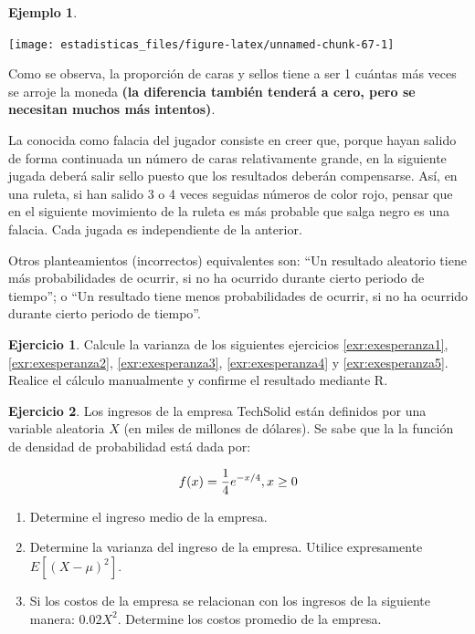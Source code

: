 \documentclass[
  11pt,
]{book}
\providecommand{\tightlist}{%
  \setlength{\itemsep}{0pt}\setlength{\parskip}{0pt}}
\theoremstyle{definition}
\theoremstyle{definition}
\newtheorem{example}{Ejemplo}[chapter]
\theoremstyle{definition}
\newtheorem{exercise}{Ejercicio}[chapter]
\theoremstyle{definition}
\theoremstyle{remark}
\begin{document}
\begin{example}
\begin{center}\texttt{[image: estadisticas\_files/figure-latex/unnamed-chunk-67-1]} \end{center}

Como se observa, la proporción de caras y sellos tiene a ser 1 cuántas más veces se arroje la moneda \textbf{(la diferencia también tenderá a cero, pero se necesitan muchos más intentos)}.

La conocida como falacia del jugador consiste en creer que, porque hayan salido de forma continuada un número de caras relativamente grande, en la siguiente jugada deberá salir sello puesto que los resultados deberán compensarse. Así, en una ruleta, si han salido 3 o 4 veces seguidas números de color rojo, pensar que en el siguiente movimiento de la ruleta es más probable que salga negro es una falacia. Cada jugada es independiente de la anterior.

Otros planteamientos (incorrectos) equivalentes son: ``Un resultado aleatorio tiene más probabilidades de ocurrir, si no ha ocurrido durante cierto periodo de tiempo''; o ``Un resultado tiene menos probabilidades de ocurrir, si no ha ocurrido durante cierto periodo de tiempo''.
\end{example}

\begin{exercise}
Calcule la varianza de los siguientes ejercicios \ref{exr:exesperanza1}, \ref{exr:exesperanza2}, \ref{exr:exesperanza3}, \ref{exr:exesperanza4} y \ref{exr:exesperanza5}. Realice el cálculo manualmente y confirme el resultado mediante R.
\end{exercise}

\begin{exercise}

Los ingresos de la empresa TechSolid están definidos por una variable aleatoria \(X\) (en miles de millones de dólares). Se sabe que la la función de densidad de probabilidad está dada por:

\begin{equation}
\notag
f(x) = \frac{1}{4} e^{-x/4},  x \geq 0
\end{equation}

\begin{enumerate}
\def\labelenumi{\arabic{enumi}.}
\tightlist
\item
  Determine el ingreso medio de la empresa.
\item
  Determine la varianza del ingreso de la empresa. Utilice expresamente \(E[(X-\mu)^2]\).
\item
  Si los costos de la empresa se relacionan con los ingresos de la siguiente manera: \(0.02X^2\). Determine los costos promedio de la empresa.
\end{enumerate}

\end{exercise}
\end{document}
